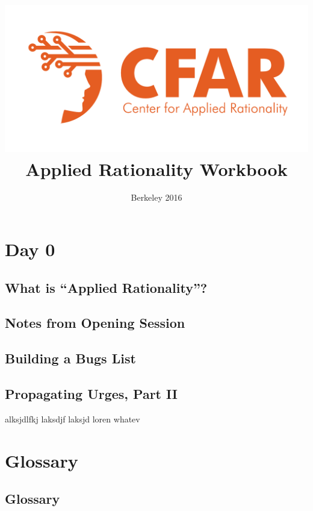 \documentclass[12pt, letterpaper, openany]{book}
\title{\includegraphics[scale=0.35]{../../../img/logo.png}\\Applied Rationality Workbook}
\author{Berkeley 2016}
\date{}
\begin{document}
	\frontmatter
	\maketitle
	
	
	\mainmatter
	\tableofcontents
	\part*{Day 0}
		\chapter{What is ``Applied Rationality''?}
			
		\chapter{Notes from Opening Session}
			
		\chapter{Building a Bugs List}
			
		\chapter{Propagating Urges, Part II}	
			
	alksjdlfkj laksdjf laksjd loren whatev
	
	\part*{Glossary}
		\chapter{Glossary}
		

	
\end{document}
